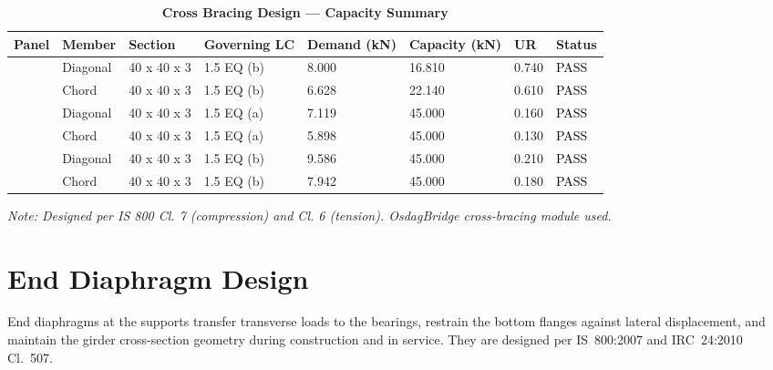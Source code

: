 \documentclass[12pt,a4paper]{report}
\numberwithin{table}{chapter}
\numberwithin{figure}{chapter}
\begin{document}
\vspace{1em}
\begin{longtable}{|C{2.0cm}|L{1.8cm}|C{2.2cm}|C{3.0cm}|C{1.8cm}|C{1.8cm}|C{1.2cm}|C{1.8cm}|}
\caption{\textbf{Cross Bracing Design --- Capacity Summary}}\\
\hline
\textbf{Panel} & \textbf{Member} & \textbf{Section} & \textbf{Governing LC} & \textbf{Demand (kN)} & \textbf{Capacity (kN)} & \textbf{UR} & \textbf{Status} \\[6pt]
\hline
{} & Diagonal & 40 x 40 x 3 & 1.5 EQ (b) & 8.000 & 16.810 & 0.740 & \textcolor{black}{PASS} \\[6pt]
 & Chord & 40 x 40 x 3 & 1.5 EQ (b) & 6.628 & 22.140 & 0.610 & \textcolor{black}{PASS} \\[6pt]
\hline
{} & Diagonal & 40 x 40 x 3 & 1.5 EQ (a) & 7.119 & 45.000 & 0.160 & \textcolor{black}{PASS} \\[6pt]
 & Chord & 40 x 40 x 3 & 1.5 EQ (a) & 5.898 & 45.000 & 0.130 & \textcolor{black}{PASS} \\[6pt]
\hline
{} & Diagonal & 40 x 40 x 3 & 1.5 EQ (b) & 9.586 & 45.000 & 0.210 & \textcolor{black}{PASS} \\[6pt]
 & Chord & 40 x 40 x 3 & 1.5 EQ (b) & 7.942 & 45.000 & 0.180 & \textcolor{black}{PASS} \\[6pt]
\hline
\end{longtable}
\noindent\textit{Note: Designed per IS 800 Cl. 7 (compression) and Cl. 6 (tension). OsdagBridge cross-bracing module used.}

\section{End Diaphragm Design}
\label{sec:end-diaphragm}

End diaphragms at the supports transfer transverse loads to the bearings, restrain the bottom flanges against lateral displacement, and maintain the girder cross-section geometry during construction and in service. They are designed per IS~800:2007 and IRC~24:2010 Cl.~507.

\vspace{1em}

\vspace{0.4em}
\noindent
\setlength{\tabcolsep}{4pt}
\setlength{\LTleft}{0pt}
\setlength{\LTright}{\fill}
\end{document}
